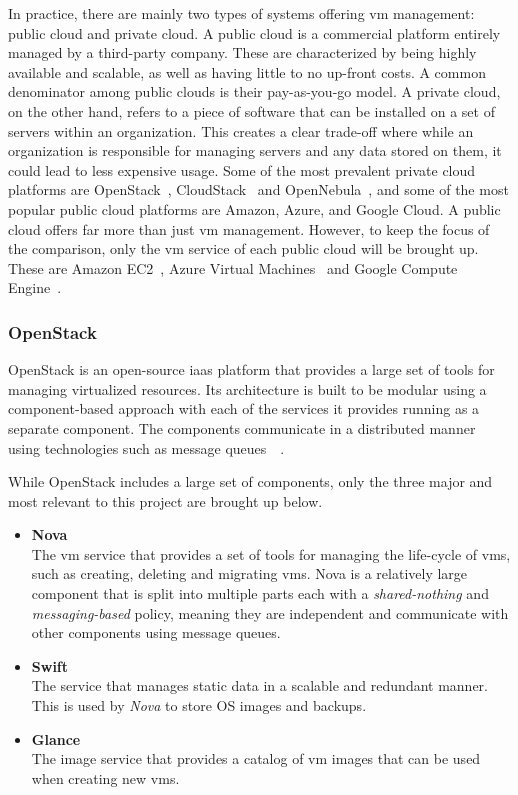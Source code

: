 \documentclass{kththesis}
\begin{document}
In practice, there are mainly two types of systems offering \Gls{vm} management: public cloud and private cloud. A public cloud is a commercial platform entirely managed by a third-party company. These are characterized by being highly available and scalable, as well as having little to no up-front costs. A common denominator among public clouds is their pay-as-you-go model. A private cloud, on the other hand, refers to a piece of software that can be installed on a set of servers within an organization. This creates a clear trade-off where while an organization is responsible for managing servers and any data stored on them, it could lead to less expensive usage. Some of the most prevalent private cloud platforms are OpenStack\ \cite{openstack-overview}, CloudStack\ \cite{cs-overview} and OpenNebula\ \cite{openstack-opennebula-comparison}, and some of the most popular public cloud platforms are Amazon, Azure, and Google Cloud. A public cloud offers far more than just \Gls{vm} management. However, to keep the focus of the comparison, only the \Gls{vm} service of each public cloud will be brought up. These are Amazon EC2\ \cite{ec2-overview}, Azure Virtual Machines\ \cite{azure-overview} and Google Compute Engine\ \cite{gce-overview}.

\subsubsection*{OpenStack}
OpenStack is an open-source \Gls{iaas} platform that provides a large set of tools for managing virtualized resources. Its architecture is built to be modular using a component-based approach with each of the services it provides running as a separate component. The components communicate in a distributed manner using technologies such as message queues\ \cite{openstack-opennebula-comparison}\ \cite{openstack-overview}.

While OpenStack includes a large set of components, only the three major and most relevant to this project are brought up below.
\begin{itemize}
    \item \textbf{Nova}\\ The \Gls{vm} service that provides a set of tools for managing the life-cycle of \Glspl{vm}, such as creating, deleting and migrating \Glspl{vm}. Nova is a relatively large component that is split into multiple parts each with a \textit{shared-nothing} and \textit{messaging-based} policy, meaning they are independent and communicate with other components using message queues. 
    \item \textbf{Swift}\\ The service that manages static data in a scalable and redundant manner. This is used by \textit{Nova} to store \Gls{OS} images and backups.
    \item \textbf{Glance}\\ The image service that provides a catalog of \Gls{vm} images that can be used when creating new \Glspl{vm}.  
\end{itemize}
\end{document}
